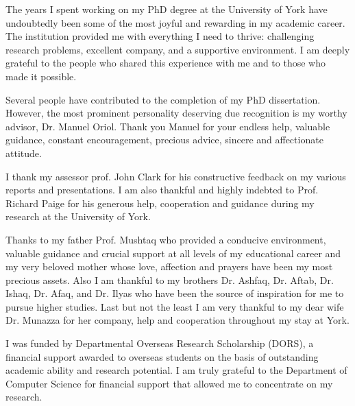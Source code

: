 \begin{acknowledgements}
The years I spent working on my PhD degree at the University of York have undoubtedly been some of the most joyful and rewarding in my academic career. The institution provided me with everything I need to thrive: challenging research problems, excellent company, and a supportive environment. I am deeply grateful to the people who shared this experience with me and to those who made it possible. 

Several people have contributed to the completion of my PhD dissertation. However, the most prominent personality deserving due recognition is my worthy advisor, Dr. Manuel Oriol. Thank you Manuel for your endless help, valuable guidance, constant encouragement, precious advice, sincere and affectionate attitude.

I thank my assessor prof. John Clark for his constructive feedback on my various reports and presentations. I am also thankful and highly indebted to Prof. Richard Paige for his generous help, cooperation and guidance during my research at the University of York.

Thanks to my father Prof. Mushtaq who provided a conducive environment, valuable guidance and crucial support at all levels of my educational career and my very beloved mother whose love, affection and prayers have been my most precious assets. Also I am thankful to my brothers Dr. Ashfaq, Dr. Aftab, Dr. Ishaq, Dr. Afaq, and Dr. Ilyas who have been the source of inspiration for me to pursue higher studies. Last but not the least I am very thankful to my dear wife Dr. Munazza for her company, help and cooperation throughout my stay at York.

I was funded by Departmental Overseas Research Scholarship (DORS), a financial support awarded to overseas students on the basis of outstanding academic ability and research potential. I am truly grateful to the Department of Computer Science for financial support that allowed me to concentrate on my research.

\end{acknowledgements}
